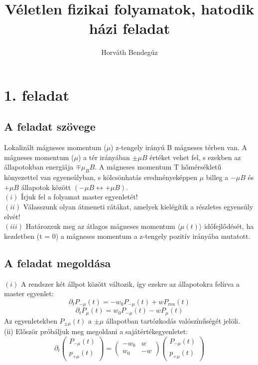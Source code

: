 \documentclass[12pt]{article}
\title{Véletlen fizikai folyamatok, hatodik házi feladat}
\author{Horváth Bendegúz}
\begin{document}
\maketitle
\section*{1. feladat}
\subsection*{A feladat szövege}
Lokalizált mágneses momentum ($\mu$) z-tengely irányú B mágneses térben van. A mágneses
momentum ($\mu$) a tér irányában $\pm\mu B$ értéket vehet fel, s ezekben az állapotokban energiája $ \mp\mu_BB$. A mágneses momentum T hőmérsékletű könyezettel van egyensúlyban, s kölcsönhatás eredményeképpen $\mu$ billeg a $-\mu B$ és $+\mu B$ állapotok között $ (-\mu B \leftrightarrow  +\mu B)$.\\
$(i)$ Írjuk fel a folyamat master egyenletét!\\
$(ii)$ Válasszunk olyan átmeneti rátákat, amelyek kielégítik a részletes egyensúly elvét!\\
$(iii)$ Határozzuk meg az átlagos mágneses momentum $\langle \mu (t)\rangle$ időfejlődését, ha kezdetben (t = 0) a mágneses momentum a z-tengely pozitív irányába mutatott.
\subsection*{A feladat megoldása}
$(i)$ A rendszer két állpot között változik, így ezekre az állapotokra felírva a master egyenlet:
$$\partial _tP_{-\mu}(t) = -w_0P_{-\mu}(t) + wP_{mu}(t)$$
$$\partial_t P_{\mu}(t)= w_0P_{-\mu}(t) - w P_{\mu}(t)$$
Az egyenletekben $P_{\pm\mu}(t)$ a $\pm\mu$ állapotban tartózkodás valószínűségét jelöli. \\
(ii) Először próbáljuk meg megoldani a sajátértékegyenletet:
\[
\partial_t
\begin{pmatrix}
P_{-\mu}(t)\\
p_{+\mu}(t)
\end{pmatrix}=
\begin{pmatrix}
-w_0& w\\
w_0 & -w
\end{pmatrix}
\begin{pmatrix}
P_{-\mu}(t)\\
p_{+\mu}(t)
\end{pmatrix}
\]
\end{document}
